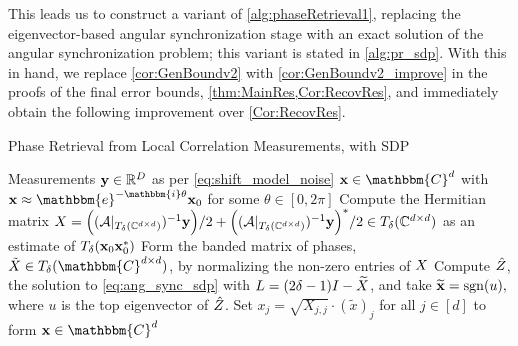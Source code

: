 This leads us to construct a variant of \cref{alg:phaseRetrieval1}, replacing the eigenvector-based angular synchronization stage with an exact solution of the angular synchronization problem; this variant is stated in \cref{alg:pr_sdp}.  With this in hand, we replace \cref{cor:GenBoundv2} with \cref{cor:GenBoundv2_improve} in the proofs of the final error bounds, \cref{thm:MainRes,Cor:RecovRes}, and immediately obtain the following improvement over \cref{Cor:RecovRes}.

\begin{algorithm}
\renewcommand{\algorithmicrequire}{\textbf{Input:}}
\renewcommand{\algorithmicensure}{\textbf{Output:}}
\caption{Phase Retrieval from Local Correlation Measurements, with SDP}
\label{alg:pr_sdp}
\begin{algorithmic}[1]
    \REQUIRE Measurements $\mathbf{y}\in \mathbb{R}^D$ as per \eqref{eq:shift_model_noise}
    \ENSURE ${\bf x} \in \mathbbm{C}^d$ with ${\bf x} \approx \mathbbm{e}^{-\mathbbm{i} \theta} {\bf x}_0$ for some $\theta \in [0, 2 \pi]$ 
    \STATE Compute the Hermitian matrix $X = \Big( (\mathcal{A}|_{T_\delta(\mathbb{C}^{d\times d})})^{-1} {\bf y}\Big)/2 + \Big( (\mathcal{A}|_{T_\delta(\mathbb{C}^{d\times d})})^{-1} {\bf y}\Big)^*/2  \in T_\delta(\mathbb{C}^{d\times d})$ as an estimate of $T_\delta(\mathbf{x}_0\mathbf{x}_0^*)$%
    \STATE Form the banded matrix of phases, $\tilde{\X} \in T_\delta(\mathbbm{C}^{d \times d})$, by normalizing the non-zero entries of $X$ %
    \STATE Compute $\hat{Z}$, the solution to \eqref{eq:ang_sync_sdp} with $L = (2 \delta - 1) I - \widetilde{X}$, and take $\widetilde{\mathbf{x}} = \operatorname{sgn}(u),$ where $u$ is the top eigenvector of $\hat{Z}$.
    \STATE Set $x_j = \sqrt{X_{j,j}} \cdot (\tilde{x})_j$ for all $j \in [d]$ to form $\x \in \mathbbm{C}^d$
\end{algorithmic}
\end{algorithm}

